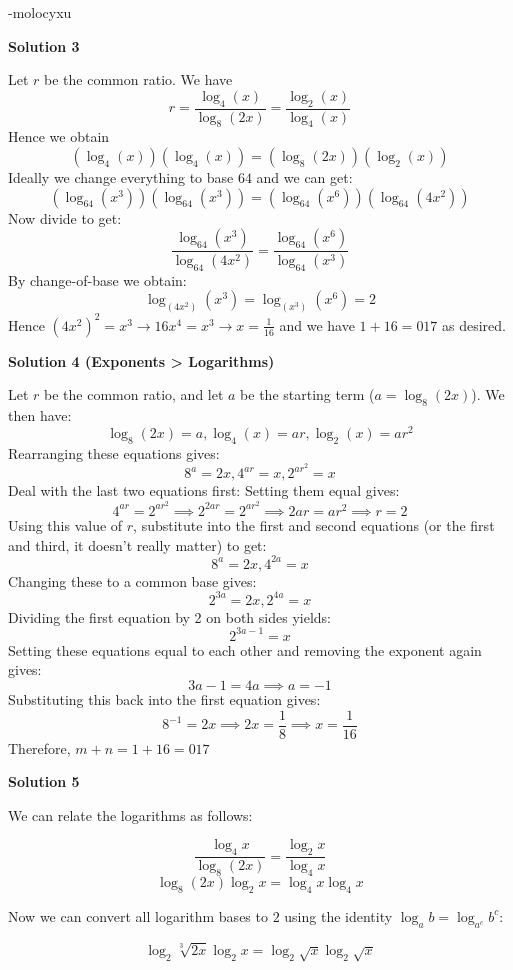 \begin{enumerate}
 -molocyxu

 



\textbf{Solution 3}

Let $r$ be the common ratio. We have 
 \[r = \frac{\log_4{(x)}}{\log_8{(2x)}} = \frac{\log_2{(x)}}{\log_4{(x)}}\]Hence we obtain 
 \[(\log_4{(x)})(\log_4{(x)}) = (\log_8{(2x)})(\log_2{(x)})\]Ideally we change everything to base $64$ and we can get: 
 \[(\log_{64}{(x^3)})(\log_{64}{(x^3)}) = (\log_{64}{(x^6)})(\log_{64}{(4x^2)})\]Now divide to get: 
 \[\frac{\log_{64}{(x^3)}}{\log_{64}{(4x^2)}} = \frac{\log_{64}{(x^6)}}{\log_{64}{(x^3)}}\]By change-of-base we obtain: 
 \[\log_{(4x^2)}{(x^3)} = \log_{(x^3)}{(x^6)} = 2\]Hence $(4x^2)^2 = x^3 \rightarrow 16x^4 = x^3 \rightarrow x = \frac{1}{16}$ and we have $1+16 = \boxed{017}$ as desired.

 



\textbf{Solution 4 (Exponents > Logarithms)}

Let $r$ be the common ratio, and let $a$ be the starting term ($a=\log_{8}{(2x)}$). We then have: 
 \[\log_{8}{(2x)}=a, \log_{4}{(x)}=ar, \log_{2}{(x)}=ar^2\] Rearranging these equations gives: 
 \[8^a=2x, 4^{ar}=x, 2^{ar^2}=x\]Deal with the last two equations first: Setting them equal gives: 
 \[4^{ar}=2^{ar^2} \implies 2^{2ar}=2^{ar^2} \implies 2ar=ar^2 \implies r=2\] Using this value of $r$, substitute into the first and second equations (or the first and third, it doesn't really matter) to get: 
 \[8^a=2x, 4^{2a}=x\] Changing these to a common base gives: 
 \[2^{3a}=2x, 2^{4a}=x\] Dividing the first equation by 2 on both sides yields: 
 \[2^{3a-1}=x\] Setting these equations equal to each other and removing the exponent again gives: 
 \[3a-1=4a \implies a=-1\] Substituting this back into the first equation gives: 
 \[8^{-1}=2x \implies 2x=\frac{1}{8} \implies x=\frac{1}{16}\] Therefore, $m+n=1+16=\boxed{017}$




\textbf{Solution 5}

We can relate the logarithms as follows:

 
 \[\frac{\log_4{x}}{\log_8{(2x)}}=\frac{\log_2{x}}{\log_4{x}}\]
 \[\log_8{(2x)}\log_2{x}=\log_4{x}\log_4{x}\]

 Now we can convert all logarithm bases to $2$ using the identity $\log_a{b}=\log_{a^c}{b^c}$:

 
 \[\log_2{\sqrt[3]{2x}}\log_2{x}=\log_2{\sqrt{x}}\log_2{\sqrt{x}}\]


\end{enumerate}
